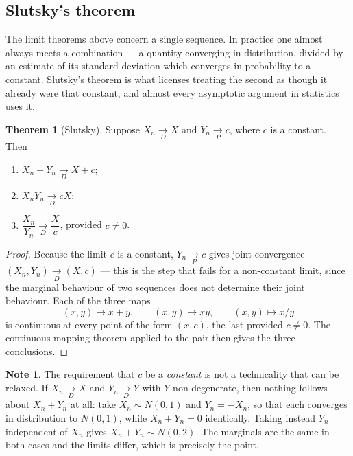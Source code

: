 \documentclass[11pt,a4paper]{article}
\theoremstyle{definition}
\newtheorem{thm}{Theorem}[subsection]
\newtheorem*{note}{Note}
\begin{document}
\subsection{Slutsky's theorem}

The limit theorems above concern a single sequence. In practice one almost
always meets a combination --- a quantity converging in distribution, divided by
an estimate of its standard deviation which converges in probability to a
constant. Slutsky's theorem is what licenses treating the second as though it
already were that constant, and almost every asymptotic argument in statistics
uses it.

\begin{thm}[Slutsky]
Suppose $X_n \underset{D}{\longrightarrow} X$ and
$Y_n \underset{P}{\longrightarrow} c$, where $c$ is a constant. Then
\begin{enumerate}
\item[(a)] $X_n + Y_n \underset{D}{\longrightarrow} X + c$;
\item[(b)] $X_nY_n \underset{D}{\longrightarrow} cX$;
\item[(c)] $\dfrac{X_n}{Y_n} \underset{D}{\longrightarrow} \dfrac{X}{c}$, provided $c\neq0$.
\end{enumerate}
\end{thm}

\begin{proof}
Because the limit $c$ is a constant, $Y_n \underset{P}{\longrightarrow} c$ gives
joint convergence $(X_n,Y_n)\underset{D}{\longrightarrow}(X,c)$ --- this is the
step that fails for a non-constant limit, since the marginal behaviour of two
sequences does not determine their joint behaviour. Each of the three maps
$$(x,y)\mapsto x+y,\qquad (x,y)\mapsto xy,\qquad (x,y)\mapsto x/y$$
is continuous at every point of the form $(x,c)$, the last provided $c\neq0$.
The continuous mapping theorem applied to the pair then gives the three
conclusions.
\end{proof}

\begin{note}
The requirement that $c$ be a \emph{constant} is not a technicality that can be
relaxed. If $X_n\underset{D}{\longrightarrow}X$ and
$Y_n\underset{D}{\longrightarrow}Y$ with $Y$ non-degenerate, then nothing
follows about $X_n+Y_n$ at all: take $X_n\sim N(0,1)$ and $Y_n=-X_n$, so that
each converges in distribution to $N(0,1)$, while $X_n+Y_n=0$ identically.
Taking instead $Y_n$ independent of $X_n$ gives $X_n+Y_n\sim N(0,2)$. The
marginals are the same in both cases and the limits differ, which is precisely
the point.
\end{note}
\end{document}
